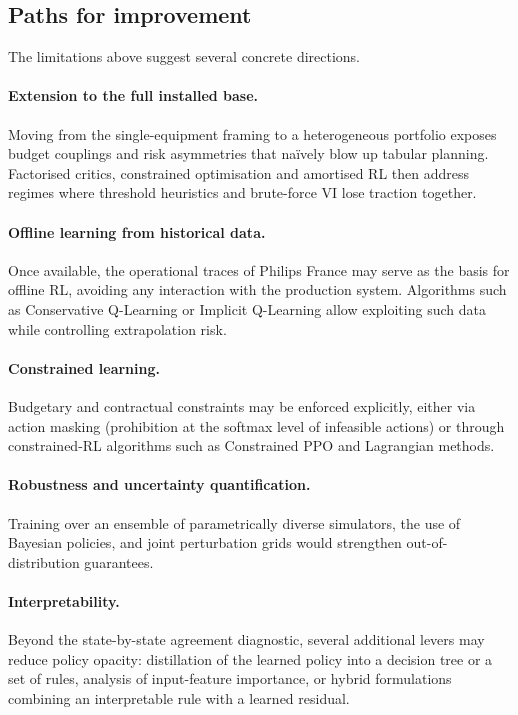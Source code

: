 \subsection{Paths for improvement}
\label{subsec:improvements}

The limitations above suggest several concrete directions.

\paragraph{Extension to the full installed base.}
Moving from the single-equipment framing to a heterogeneous portfolio exposes budget couplings and risk asymmetries that na\"ively blow up tabular planning. Factorised critics, constrained optimisation and amortised RL then address regimes where threshold heuristics and brute-force VI lose traction together.

\paragraph{Offline learning from historical data.}
Once available, the operational traces of Philips France may serve as the basis for offline RL, avoiding any interaction with the production system. Algorithms such as Conservative Q-Learning or Implicit Q-Learning allow exploiting such data while controlling extrapolation risk.

\paragraph{Constrained learning.}
Budgetary and contractual constraints may be enforced explicitly, either via action masking (prohibition at the softmax level of infeasible actions) or through constrained-RL algorithms such as Constrained PPO and Lagrangian methods.

\paragraph{Robustness and uncertainty quantification.}
Training over an ensemble of parametrically diverse simulators, the use of Bayesian policies, and joint perturbation grids would strengthen out-of-distribution guarantees.

\paragraph{Interpretability.}
Beyond the state-by-state agreement diagnostic, several additional levers may reduce policy opacity: distillation of the learned policy into a decision tree or a set of rules, analysis of input-feature importance, or hybrid formulations combining an interpretable rule with a learned residual.

